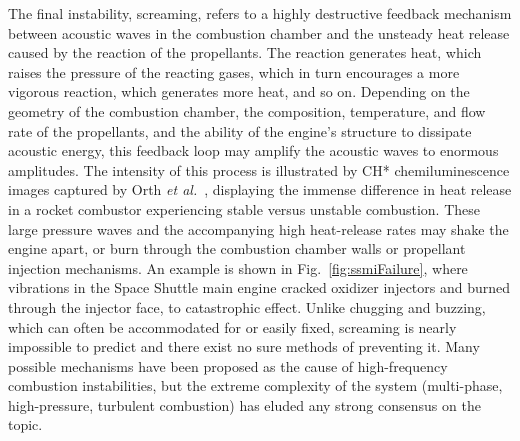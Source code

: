 The final instability, screaming, refers to a highly destructive feedback mechanism between acoustic waves in the combustion chamber and the unsteady heat release caused by the reaction of the propellants. The reaction generates heat, which raises the pressure of the reacting gases, which in turn encourages a more vigorous reaction, which generates more heat, and so on. Depending on the geometry of the combustion chamber, the composition, temperature, and flow rate of the propellants, and the ability of the engine's structure to dissipate acoustic energy, this feedback loop may amplify the acoustic waves to enormous amplitudes. The intensity of this process is illustrated by CH* chemiluminescence images captured by Orth \textit{et al.}~\cite{Orth2018}, displaying the immense difference in heat release in a rocket combustor experiencing stable versus unstable combustion. These large pressure waves and the accompanying high heat-release rates may shake the engine apart, or burn through the combustion chamber walls or propellant injection mechanisms. An example is shown in Fig.~\ref{fig:ssmiFailure}, where vibrations in the Space Shuttle main engine cracked oxidizer injectors and burned through the injector face, to catastrophic effect. Unlike chugging and buzzing, which can often be accommodated for or easily fixed, screaming is nearly impossible to predict and there exist no sure methods of preventing it. Many possible mechanisms have been proposed as the cause of high-frequency combustion instabilities, but the extreme complexity of the system (multi-phase, high-pressure, turbulent combustion) has eluded any strong consensus on the topic.

